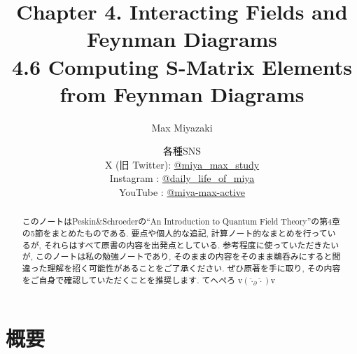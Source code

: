 \documentclass[a4paper,12pt]{article}
\title{Chapter 4. Interacting Fields and Feynman Diagrams\\
4.6 Computing S-Matrix Elements from Feynman Diagrams}
\date{各種SNS\\
    X (旧 Twitter): \href{https://x.com/miya_max_study}{@miya\_max\_study}\\
    Instagram : \href{https://www.instagram.com/daily_life_of_miya/}{@daily\_life\_of\_miya}\\
    YouTube : \href{https://www.youtube.com/@miya-max-active}{@miya-max-active}
    }
\author{Max Miyazaki}
\begin{document}
\maketitle

\vspace{1cm}
\begin{abstract}
    このノートはPeskin\&Schroederの``An Introduction to Quantum Field Theory''の第4章の5節をまとめたものである. 要点や個人的な追記, 計算ノート的なまとめを行っているが, それらはすべて原書の内容を出発点としている. 参考程度に使っていただきたいが, このノートは私の勉強ノートであり, そのままの内容をそのまま鵜呑みにすると間違った理解を招く可能性があることをご了承ください. ぜひ原著を手に取り, その内容をご自身で確認していただくことを推奨します. てへぺろ v$({\hat{\cdot}_\partial \hat{\cdot}})$v
\end{abstract}
    
    

\newpage
\color{blue}
\section*{概要}
\end{document}
